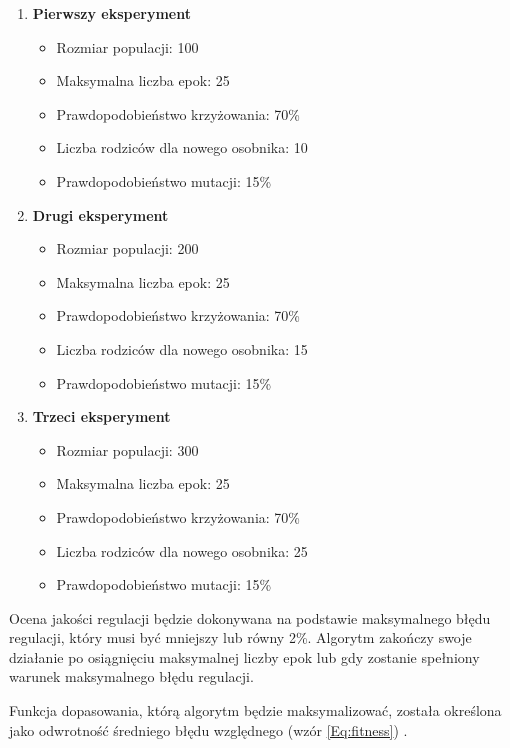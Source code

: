 \documentclass[12pt,twoside]{article}
\begin{document}
\begin{enumerate}[label=\alph*), leftmargin=1.25cm]
    \item \textbf{Pierwszy eksperyment}
    \begin{itemize}
        \item Rozmiar populacji: 100
        \item Maksymalna liczba epok: 25
        \item Prawdopodobieństwo krzyżowania: 70\%
        \item Liczba rodziców dla nowego osobnika: 10
        \item Prawdopodobieństwo mutacji: 15\%
    \end{itemize}
    
    \item \textbf{Drugi eksperyment}
    \begin{itemize}
        \item Rozmiar populacji: 200
        \item Maksymalna liczba epok: 25
        \item Prawdopodobieństwo krzyżowania: 70\%
        \item Liczba rodziców dla nowego osobnika: 15
        \item Prawdopodobieństwo mutacji: 15\%
    \end{itemize}
    
    \item \textbf{Trzeci eksperyment}
    \begin{itemize}
        \item Rozmiar populacji: 300
        \item Maksymalna liczba epok: 25
        \item Prawdopodobieństwo krzyżowania: 70\%
        \item Liczba rodziców dla nowego osobnika: 25
        \item Prawdopodobieństwo mutacji: 15\%
    \end{itemize}
\end{enumerate}


Ocena jakości regulacji będzie dokonywana na podstawie maksymalnego błędu regulacji, który musi być mniejszy lub równy 2\%. Algorytm zakończy swoje działanie po osiągnięciu maksymalnej liczby epok lub gdy zostanie spełniony warunek maksymalnego błędu regulacji.

Funkcja dopasowania, którą algorytm będzie maksymalizować, została określona jako odwrotność średniego błędu względnego (wzór \ref{Eq:fitness}) .
\end{document}
